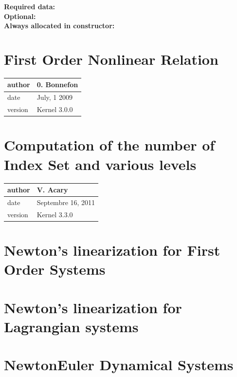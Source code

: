 \documentclass[10pt]{report}
\begin{document}
\textbf{Required data:}\\

\textbf{Optional:}\\

\textbf{Always allocated in constructor:} \\

\chapter{First Order Nonlinear Relation }

\begin{table}[!ht]
  \begin{tabular}{|l|l|}
    \hline
    author  & 0. Bonnefon \\
    \hline
    date    & July, 1 2009 \\
    \hline
    version & Kernel 3.0.0 \\
    \hline
  \end{tabular}
\end{table}

\chapter{Computation of the number of Index Set and various levels}
\begin{table}[!ht]
  \begin{tabular}{|l|l|}
    \hline
    author  & V. Acary \\
    \hline
    date    & Septembre 16, 2011 \\
    \hline
    version & Kernel 3.3.0 \\
    \hline
  \end{tabular}
\end{table}




\chapter{Newton's linearization for First Order Systems}

\chapter{Newton's linearization for Lagrangian systems}

\chapter{NewtonEuler Dynamical Systems}

\end{document}
